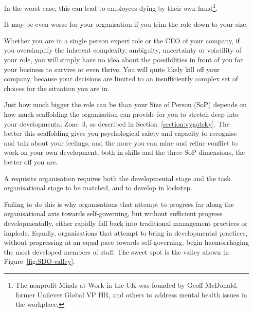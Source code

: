 In the worst case, this can lead to employees dying by their own hand\footnote{The nonprofit Minds at Work  in the UK was founded by Geoff McDonald,  former Unilever Global VP HR, and others to address mental health issues in the workplace.}.


It may be even worse for your organisation if you trim the role down to your size. 


Whether you are in a single person expert role or the CEO of your company, if you oversimplify the inherent complexity, ambiguity, uncertainty or volatility of your role, you will simply have no idea about the possibilities  in front of you for your business to survive or even thrive. You will quite likely kill off your company, because your decisions are limited to an insufficiently complex set of choices for the situation you are in.


Just how much bigger the role can be than your Size of Person (SoP) depends on how much scaffolding the organisation can provide for you to stretch deep into your developmental Zone~3, as described in Section~\ref{section:vygotsky}. The better this scaffolding gives you psychological safety and capacity to recognise and talk about your feelings, and the more you can mine and refine conflict to work on your own development, both in skills and the three SoP dimensions, the better off you are.


A requisite organisation requires both the developmental stage and the task organisational stage to be matched, and to develop in lockstep. 


Failing to do this is why organisations that attempt to progress far along the organisational axis towards self-governing, but without sufficient progress developmentally, either rapidly fall back into traditional management practices or implode. Equally, organisations that attempt to bring in developmental practices, without progressing at an equal pace towards self-governing, begin haemorrhaging the most developed members of staff. The sweet spot is the valley shown in Figure~\ref{fig:SDO-valley}.


